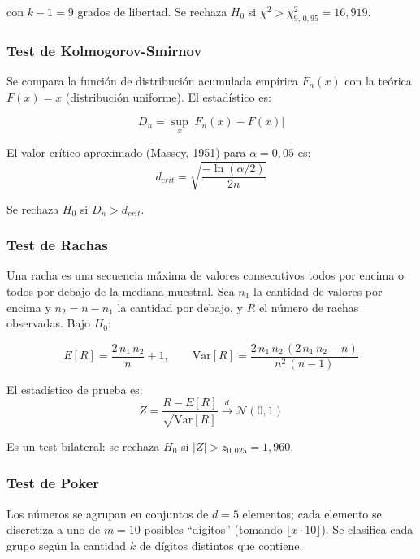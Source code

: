 \documentclass[a4paper, 11pt]{article}
\begin{document}
con $k-1 = 9$ grados de libertad. Se rechaza $H_0$ si $\chi^2 > \chi^2_{9,\,0{,}95} = 16{,}919$.

\subsubsection{Test de Kolmogorov-Smirnov}

Se compara la función de distribución acumulada empírica $F_n(x)$ con la
teórica $F(x) = x$ (distribución uniforme). El estadístico es:

\begin{equation}
  D_n = \sup_{x} \left|F_n(x) - F(x)\right|
  \label{eq:ks}
\end{equation}

El valor crítico aproximado (Massey, 1951) para $\alpha = 0{,}05$ es:
\begin{equation}
  d_{crit} = \sqrt{\frac{-\ln(\alpha/2)}{2n}}
  \label{eq:ks_critico}
\end{equation}

Se rechaza $H_0$ si $D_n > d_{crit}$.

\subsubsection{Test de Rachas}

Una racha es una secuencia máxima de valores consecutivos todos por encima
o todos por debajo de la mediana muestral. Sea $n_1$ la cantidad de valores
por encima y $n_2 = n - n_1$ la cantidad por debajo, y $R$ el número de
rachas observadas. Bajo $H_0$:

\begin{equation}
  E[R] = \frac{2\,n_1\,n_2}{n} + 1, \qquad
  \text{Var}[R] = \frac{2\,n_1\,n_2\,(2\,n_1\,n_2 - n)}{n^2\,(n-1)}
  \label{eq:rachas}
\end{equation}

El estadístico de prueba es:
\begin{equation}
  Z = \frac{R - E[R]}{\sqrt{\text{Var}[R]}} \xrightarrow{d} \mathcal{N}(0,1)
  \label{eq:rachas_z}
\end{equation}

Es un test bilateral: se rechaza $H_0$ si $|Z| > z_{0{,}025} = 1{,}960$.

\subsubsection{Test de Poker}

Los números se agrupan en conjuntos de $d = 5$ elementos; cada elemento se
discretiza a uno de $m = 10$ posibles ``dígitos'' (tomando $\lfloor x \cdot 10 \rfloor$).
Se clasifica cada grupo según la cantidad $k$ de dígitos distintos que contiene.
\end{document}
